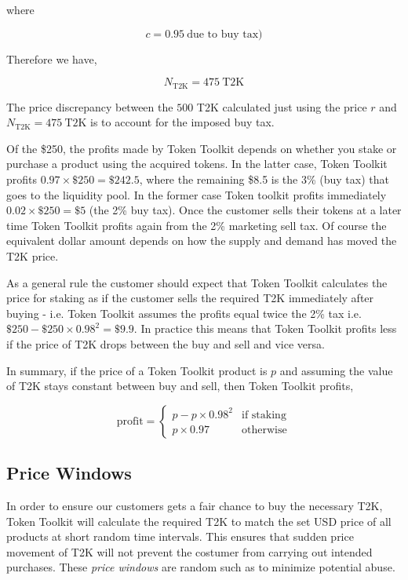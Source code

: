 \documentclass[11pt]{article}
\begin{document}
where

$$
c= 0.95~\text{due to buy tax)}
$$

Therefore we have,

$$
N_{{\text{T2K}}} = 475~\text{T2K}
$$

The price discrepancy between the \(500\) T2K calculated just using the price \(r\)
and \(N_{\text{T2K}}=475~\text{T2K}\) is to account for the imposed buy tax.

Of the \$250, the profits made by Token Toolkit depends on whether you stake or
purchase a product using the acquired tokens. In the latter case, Token Toolkit
profits \(0.97\times \$250 = \$242.5\), where the remaining \$8.5 is the 3\% (buy
tax) that goes to the liquidity pool. In the former case Token toolkit profits
immediately \(0.02 \times \$250 = \$5\) (the 2\% buy tax). Once the customer
sells their tokens at a later time Token Toolkit profits again from the 2\%
marketing sell tax. Of course the equivalent dollar amount depends on how the
supply and demand has moved the T2K price.

As a general rule the customer should expect that Token Toolkit calculates the
price for staking as if the customer sells the required T2K immediately after
buying - i.e. Token Toolkit assumes the profits equal twice the 2\% tax i.e.
\(\$250 - \$250 \times 0.98^2 = \$9.9\). In practice this means that Token
Toolkit profits less if the price of T2K drops between the buy and sell and vice
versa.

In summary, if the price of a Token Toolkit product is \(p\) and assuming the
value of T2K stays constant between buy and sell, then Token Toolkit profits,

$$ \text{profit}= \begin{cases} p - p\times0.98^{2} & \text{if staking} \\ p\times0.97 & \text{otherwise} \end{cases}$$

\subsection*{Price Windows}
\label{sec:org5342354}
In order to ensure our customers gets a fair chance to buy the necessary T2K,
Token Toolkit will calculate the required T2K to match the set USD price of all
products at short random time intervals. This ensures that sudden price movement
of T2K will not prevent the costumer from carrying out intended purchases. These
\emph{price windows} are random such as to minimize potential abuse.
\end{document}
